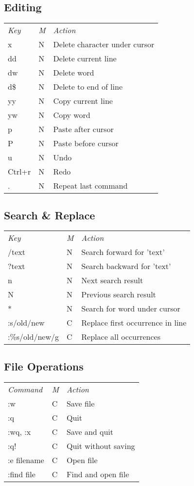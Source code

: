 \subsection{Editing}
	\begin{tabularx}{\tablewidth}{llX}
		\emph{Key} & \emph{M} & \emph{Action} \\
		x          & N & Delete character under cursor \\
		dd         & N & Delete current line \\
		dw         & N & Delete word \\
		d\$        & N & Delete to end of line \\
		yy         & N & Copy current line \\
		yw         & N & Copy word \\
		p          & N & Paste after cursor \\
		P          & N & Paste before cursor \\
		u          & N & Undo \\
		Ctrl+r     & N & Redo \\
		.          & N & Repeat last command \\
	\end{tabularx}

\subsection{Search \& Replace}
	\begin{tabularx}{\tablewidth}{llX}
		\emph{Key} & \emph{M} & \emph{Action} \\
		/text      & N & Search forward for 'text' \\
		?text      & N & Search backward for 'text' \\
		n          & N & Next search result \\
		N          & N & Previous search result \\
		*          & N & Search for word under cursor \\
		:s/old/new & C & Replace first occurrence in line \\
		:\%s/old/new/g & C & Replace all occurrences \\
	\end{tabularx}

\subsection{File Operations}
	\begin{tabularx}{\tablewidth}{llX}
		\emph{Command} & \emph{M} & \emph{Action} \\
		:w             & C & Save file \\
		:q             & C & Quit \\
		:wq, :x        & C & Save and quit \\
		:q!            & C & Quit without saving \\
		:e filename    & C & Open file \\
		:find file     & C & Find and open file \\
	\end{tabularx}

